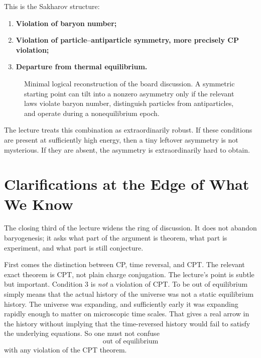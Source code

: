 This is the Sakharov structure:
\begin{enumerate}
\item \textbf{Violation of baryon number;}
\item \textbf{Violation of particle--antiparticle symmetry, more precisely CP violation;}
\item \textbf{Departure from thermal equilibrium.}
\end{enumerate}

\begin{figure}[ht]
\centering
{}
\caption{Minimal logical reconstruction of the board discussion. A symmetric starting point can tilt into a nonzero asymmetry only if the relevant laws violate baryon number, distinguish particles from antiparticles, and operate during a nonequilibrium epoch.}
\end{figure}

The lecture treats this combination as extraordinarily robust. If these conditions are present at sufficiently high energy, then a tiny leftover asymmetry is not mysterious. If they are absent, the asymmetry is extraordinarily hard to obtain.

\section{Clarifications at the Edge of What We Know}

The closing third of the lecture widens the ring of discussion. It does not abandon baryogenesis; it asks what part of the argument is theorem, what part is experiment, and what part is still conjecture.

First comes the distinction between CP, time reversal, and CPT. The relevant exact theorem is CPT, not plain charge conjugation. The lecture's point is subtle but important. Condition 3 is \emph{not} a violation of CPT. To be out of equilibrium simply means that the actual history of the universe was not a static equilibrium history. The universe was expanding, and sufficiently early it was expanding rapidly enough to matter on microscopic time scales. That gives a real arrow in the history without implying that the time-reversed history would fail to satisfy the underlying equations. So one must not confuse
\begin{equation}
\text{out of equilibrium}
\end{equation}
with any violation of the CPT theorem.

